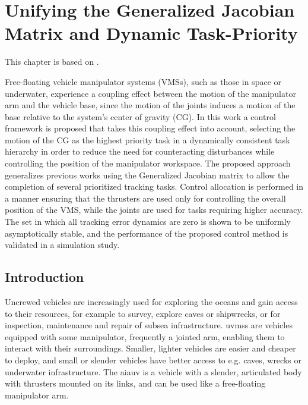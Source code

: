 \documentclass[../main.tex]{subfiles}
\begin{document}
\chapter{Unifying the Generalized Jacobian Matrix and Dynamic Task-Priority}

This chapter is based on \cite{wrzos-kaminska2024}.


Free-floating vehicle manipulator systems (VMSs), such as those in space or underwater, experience a coupling effect between the motion of the manipulator arm and the vehicle base, since the motion of the joints induces a motion of the base relative to the system's center of gravity (CG).
In this work a control framework is proposed that takes this coupling effect into account, selecting the motion of the CG as the highest priority task in a dynamically consistent task hierarchy in order to reduce the need for counteracting disturbances while controlling the position of the manipulator workspace. %
The proposed approach generalizes previous works using the Generalized Jacobian matrix to allow the completion of several prioritized tracking tasks. Control allocation is performed in a manner ensuring that the thrusters are used only for controlling the overall position of the VMS, while the joints are used for tasks requiring higher accuracy. %
The set in which all tracking error dynamics are zero is shown to be uniformly asymptotically stable, and the performance of the proposed control method is validated in a simulation study.

\section{Introduction}
Uncrewed vehicles are increasingly used for exploring the oceans and gain access to their resources, for example to survey, explore caves or shipwrecks, or for inspection, maintenance and repair of subsea infrastructure. \Glspl{uvms} are vehicles equipped with some manipulator, frequently a jointed arm, enabling them to interact with their surroundings.
Smaller, lighter vehicles are easier and cheaper to deploy, and small or slender vehicles have better access to e.g. caves, wrecks or underwater infrastructure. The \gls{aiauv} is a vehicle with a slender, articulated body with thrusters mounted on its links, and can be used like a free-floating manipulator arm.%
\end{document}

